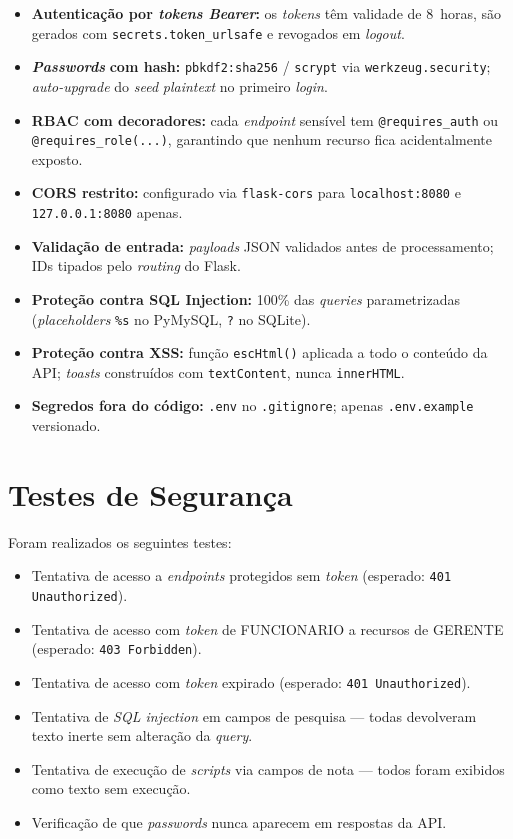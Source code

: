 \documentclass[11pt,a4paper]{report}
\begin{document}
\begin{itemize}
  \item \textbf{Autenticação por \textit{tokens Bearer}:} os \textit{tokens} têm validade de 8~horas, são gerados com \texttt{secrets.token\_urlsafe} e revogados em \textit{logout}.
  \item \textit{\textbf{Passwords}} \textbf{com hash:} \texttt{pbkdf2:sha256} / \texttt{scrypt} via \texttt{werkzeug.security}; \textit{auto-upgrade} do \textit{seed} \textit{plaintext} no primeiro \textit{login}.
  \item \textbf{RBAC com decoradores:} cada \textit{endpoint} sensível tem \texttt{@requires\_auth} ou \texttt{@requires\_role(...)}, garantindo que nenhum recurso fica acidentalmente exposto.
  \item \textbf{CORS restrito:} configurado via \texttt{flask-cors} para \texttt{localhost:8080} e \texttt{127.0.0.1:8080} apenas.
  \item \textbf{Validação de entrada:} \textit{payloads} JSON validados antes de processamento; IDs tipados pelo \textit{routing} do Flask.
  \item \textbf{Proteção contra SQL Injection:} 100\% das \textit{queries} parametrizadas (\textit{placeholders} \texttt{\%s} no PyMySQL, \texttt{?} no SQLite).
  \item \textbf{Proteção contra XSS:} função \texttt{escHtml()} aplicada a todo o conteúdo da API; \textit{toasts} construídos com \texttt{textContent}, nunca \texttt{innerHTML}.
  \item \textbf{Segredos fora do código:} \texttt{.env} no \texttt{.gitignore}; apenas \texttt{.env.example} versionado.
\end{itemize}

\section{Testes de Segurança}
Foram realizados os seguintes testes:

\begin{itemize}
  \item Tentativa de acesso a \textit{endpoints} protegidos sem \textit{token} (esperado: \texttt{401 Unauthorized}).
  \item Tentativa de acesso com \textit{token} de FUNCIONARIO a recursos de GERENTE (esperado: \texttt{403 Forbidden}).
  \item Tentativa de acesso com \textit{token} expirado (esperado: \texttt{401 Unauthorized}).
  \item Tentativa de \textit{SQL injection} em campos de pesquisa --- todas devolveram texto inerte sem alteração da \textit{query}.
  \item Tentativa de execução de \textit{scripts} via campos de nota --- todos foram exibidos como texto sem execução.
  \item Verificação de que \textit{passwords} nunca aparecem em respostas da API.
\end{itemize}
\end{document}
